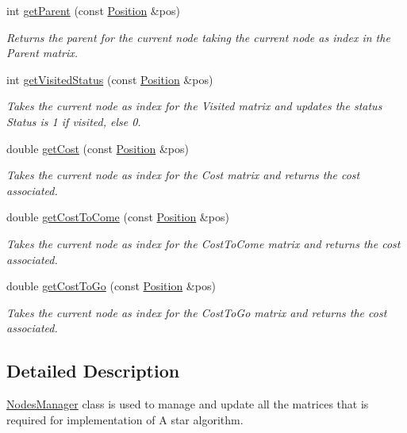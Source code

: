 \begin{DoxyCompactItemize}
int \hyperlink{classNodesManager_a27495b9f67db0f9955945269657b3191}{get\+Parent} (const \hyperlink{structPosition}{Position} \&pos)
\begin{DoxyCompactList}\small\item\em Returns the parent for the current node taking the current node as index in the Parent matrix. \end{DoxyCompactList}\item 
int \hyperlink{classNodesManager_a37e0acde250e53d0be293d0cdea45bee}{get\+Visited\+Status} (const \hyperlink{structPosition}{Position} \&pos)
\begin{DoxyCompactList}\small\item\em Takes the current node as index for the Visited matrix and updates the status Status is 1 if visited, else 0. \end{DoxyCompactList}\item 
double \hyperlink{classNodesManager_a9388387bf31344892829af09ccaf85aa}{get\+Cost} (const \hyperlink{structPosition}{Position} \&pos)
\begin{DoxyCompactList}\small\item\em Takes the current node as index for the Cost matrix and returns the cost associated. \end{DoxyCompactList}\item 
double \hyperlink{classNodesManager_a923055427dd01d11b00ea6b41bca15c0}{get\+Cost\+To\+Come} (const \hyperlink{structPosition}{Position} \&pos)
\begin{DoxyCompactList}\small\item\em Takes the current node as index for the Cost\+To\+Come matrix and returns the cost associated. \end{DoxyCompactList}\item 
double \hyperlink{classNodesManager_a55868373af6f6507768094089948c35f}{get\+Cost\+To\+Go} (const \hyperlink{structPosition}{Position} \&pos)
\begin{DoxyCompactList}\small\item\em Takes the current node as index for the Cost\+To\+Go matrix and returns the cost associated. \end{DoxyCompactList}\end{DoxyCompactItemize}


\subsection{Detailed Description}
\hyperlink{classNodesManager}{Nodes\+Manager} class is used to manage and update all the matrices that is required for implementation of A star algorithm. 

